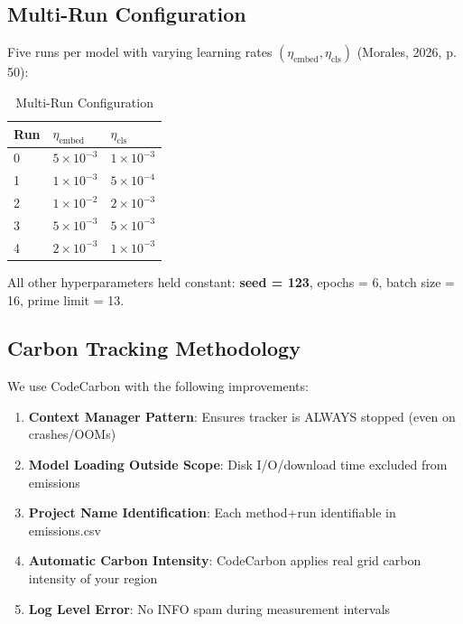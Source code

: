\documentclass{article}
\begin{document}
\subsection{Multi-Run Configuration}

Five runs per model with varying learning rates $(\eta_{\text{embed}}, \eta_{\text{cls}})$ (Morales, 2026, p. 50):

\begin{table}[ht]
\centering
\caption{Multi-Run Configuration}
\begin{tabular}{lll}
\toprule
Run & $\eta_{\text{embed}}$ & $\eta_{\text{cls}}$ \\
\midrule
0 & $5 \times 10^{-3}$ & $1 \times 10^{-3}$ \\
1 & $1 \times 10^{-3}$ & $5 \times 10^{-4}$ \\
2 & $1 \times 10^{-2}$ & $2 \times 10^{-3}$ \\
3 & $5 \times 10^{-3}$ & $5 \times 10^{-3}$ \\
4 & $2 \times 10^{-3}$ & $1 \times 10^{-3}$ \\
\bottomrule
\end{tabular}
\end{table}

All other hyperparameters held constant: \textbf{seed = 123}, epochs = 6, batch size = 16, prime limit = 13.

\subsection{Carbon Tracking Methodology}

We use CodeCarbon with the following improvements:

\begin{enumerate}
\item \textbf{Context Manager Pattern}: Ensures tracker is ALWAYS stopped (even on crashes/OOMs)
\item \textbf{Model Loading Outside Scope}: Disk I/O/download time excluded from emissions
\item \textbf{Project Name Identification}: Each method+run identifiable in emissions.csv
\item \textbf{Automatic Carbon Intensity}: CodeCarbon applies real grid carbon intensity of your region
\item \textbf{Log Level Error}: No INFO spam during measurement intervals
\end{enumerate}
\end{document}
